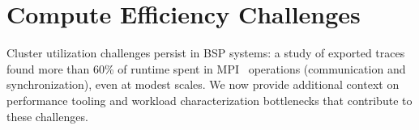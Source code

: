 

\section{Compute Efficiency Challenges}
\label{sec:bg:compute}

Cluster utilization challenges persist in BSP systems: a study of exported traces found more than
60\% of runtime spent in MPI~\cite{:MPI} operations (communication and synchronization), even at
modest scales.
We now provide additional context on performance tooling and workload characterization bottlenecks
that contribute to these challenges.


